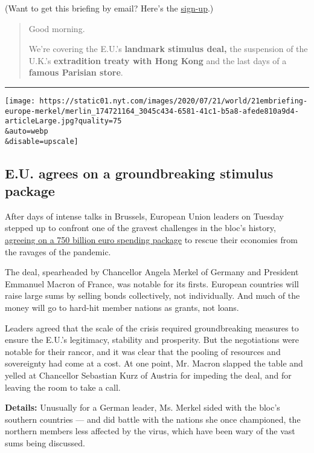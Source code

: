 (Want to get this briefing by email? Here's the
\href{https://www.nytimes.com/morning-briefing}{sign-up}.)

\begin{quote}
Good morning.

We're covering the E.U.'s \textbf{landmark stimulus deal,} the
suspension of the U.K.'s \textbf{extradition treaty with Hong Kong} and
the last days of a \textbf{famous Parisian store}.
\end{quote}

\begin{center}\rule{0.5\linewidth}{\linethickness}\end{center}

\texttt{[image: https://static01.nyt.com/images/2020/07/21/world/21embriefing-europe-merkel/merlin\_174721164\_3045c434-6581-41c1-b5a8-afede810a9d4-articleLarge.jpg?quality=75\\\&auto=webp\\\&disable=upscale]}

\hypertarget{eu-agrees-on-a-groundbreaking-stimulus-package}{%
\subsection{E.U. agrees on a groundbreaking stimulus
package}\label{eu-agrees-on-a-groundbreaking-stimulus-package}}

After days of intense talks in Brussels, European Union leaders on
Tuesday stepped up to confront one of the gravest challenges in the
bloc's history,
\href{https://www.nytimes.com/2020/07/20/world/europe/eu-stimulus-coronavirus.html}{agreeing
on a 750 billion euro spending package} to rescue their economies from
the ravages of the pandemic.

The deal, spearheaded by Chancellor Angela Merkel of Germany and
President Emmanuel Macron of France, was notable for its firsts.
European countries will raise large sums by selling bonds collectively,
not individually. And much of the money will go to hard-hit member
nations as grants, not loans.

Leaders agreed that the scale of the crisis required groundbreaking
measures to ensure the E.U.'s legitimacy, stability and prosperity. But
the negotiations were notable for their rancor, and it was clear that
the pooling of resources and sovereignty had come at a cost. At one
point, Mr. Macron slapped the table and yelled at Chancellor Sebastian
Kurz of Austria for impeding the deal, and for leaving the room to take
a call.

\textbf{Details:} Unusually for a German leader, Ms. Merkel sided with
the bloc's southern countries --- and did battle with the nations she
once championed, the northern members less affected by the virus, which
have been wary of the vast sums being discussed.

